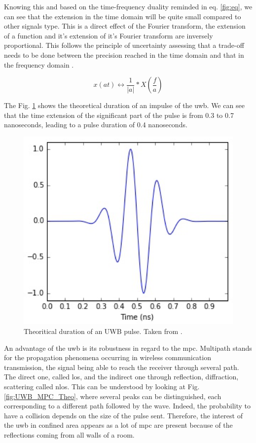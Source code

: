 Knowing this and based on the time-frequency duality reminded in eq. \ref{fig:eq}, we can see that the extension in the time domain will be quite small compared to other signals type. This is a direct effect of the Fourier transform, the extension of a function and it's extension of it's Fourier transform are inversely proportional. This follows the principle of uncertainty assessing that a trade-off needs to be done between the precision reached in the time domain and that in the frequency domain \cite{donoho1989uncertainty}.

\begin{equation}
	x(at) \longleftrightarrow \frac{1}{|a|}*X(\frac{f}{a})
\label{fig:eq}
\end{equation}

The Fig. \ref{fig:UWB_time} shows the theoretical duration of an impulse of the \gls{uwb}. We can see that the time extension of the significant part of the pulse is from 0.3 to 0.7 nanoseconds, leading to a pulse duration of 0.4 nanoseconds.

\begin{figure}[H]
\centering
\includegraphics[width=.4\linewidth]{Images/uwb_pulse.png}
\caption{Theoritical duration of an UWB pulse. Taken from \cite{defraye2017determining}.}
\label{fig:UWB_time}
\end{figure}

An advantage of the \gls{uwb} is its robustness in regard to the \gls{mpc}. Multipath stands for the propagation phenomena occurring in wireless communication transmission, the signal being able to reach the receiver through several path. The direct one, called \gls{los}, and the indirect one through reflection, diffraction, scattering called \gls{nlos}.  This can be understood by looking at Fig. \ref{fig:UWB_MPC_Theo}, where several peaks can be distinguished, each corresponding to a different path followed by the wave. Indeed, the probability to have a collision depends on the size of the pulse sent. Therefore, the interest of the \gls{uwb} in confined area appears as a lot of \gls{mpc} are present because of the reflections coming from all walls of a room.

